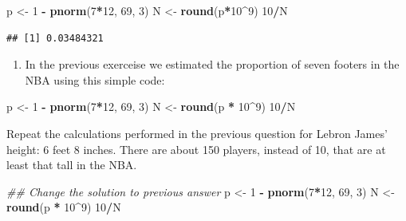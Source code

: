 \documentclass[
]{article}
\newenvironment{Shaded}{\begin{snugshade}}{\end{snugshade}}
\newcommand{\CommentTok}[1]{\textcolor[rgb]{0.56,0.35,0.01}{\textit{#1}}}
\newcommand{\DecValTok}[1]{\textcolor[rgb]{0.00,0.00,0.81}{#1}}
\newcommand{\KeywordTok}[1]{\textcolor[rgb]{0.13,0.29,0.53}{\textbf{#1}}}
\newcommand{\NormalTok}[1]{#1}
\newcommand{\OperatorTok}[1]{\textcolor[rgb]{0.81,0.36,0.00}{\textbf{#1}}}
\newcommand{\StringTok}[1]{\textcolor[rgb]{0.31,0.60,0.02}{#1}}
\providecommand{\tightlist}{%
  \setlength{\itemsep}{0pt}\setlength{\parskip}{0pt}}
\begin{document}
\begin{Shaded}
\begin{Highlighting}[]
\NormalTok{p <-}\StringTok{ }\DecValTok{1} \OperatorTok{-}\StringTok{ }\KeywordTok{pnorm}\NormalTok{(}\DecValTok{7}\OperatorTok{*}\DecValTok{12}\NormalTok{, }\DecValTok{69}\NormalTok{, }\DecValTok{3}\NormalTok{)}
\NormalTok{N <-}\StringTok{ }\KeywordTok{round}\NormalTok{(p}\OperatorTok{*}\DecValTok{10}\OperatorTok{^}\DecValTok{9}\NormalTok{)}
\DecValTok{10}\OperatorTok{/}\NormalTok{N}
\end{Highlighting}
\end{Shaded}

\begin{verbatim}
## [1] 0.03484321
\end{verbatim}

\begin{enumerate}
\def\labelenumi{\arabic{enumi}.}
\setcounter{enumi}{6}
\tightlist
\item
  In the previous exerceise we estimated the proportion of seven footers
  in the NBA using this simple code:
\end{enumerate}

\begin{Shaded}
\begin{Highlighting}[]
\NormalTok{p <-}\StringTok{ }\DecValTok{1} \OperatorTok{-}\StringTok{ }\KeywordTok{pnorm}\NormalTok{(}\DecValTok{7}\OperatorTok{*}\DecValTok{12}\NormalTok{, }\DecValTok{69}\NormalTok{, }\DecValTok{3}\NormalTok{)  }
\NormalTok{N <-}\StringTok{ }\KeywordTok{round}\NormalTok{(p }\OperatorTok{*}\StringTok{ }\DecValTok{10}\OperatorTok{^}\DecValTok{9}\NormalTok{)  }
\DecValTok{10}\OperatorTok{/}\NormalTok{N  }
\end{Highlighting}
\end{Shaded}

Repeat the calculations performed in the previous question for Lebron
James' height: 6 feet 8 inches. There are about 150 players, instead of
10, that are at least that tall in the NBA.

\begin{Shaded}
\begin{Highlighting}[]
\CommentTok{## Change the solution to previous answer}
\NormalTok{p <-}\StringTok{ }\DecValTok{1} \OperatorTok{-}\StringTok{ }\KeywordTok{pnorm}\NormalTok{(}\DecValTok{7}\OperatorTok{*}\DecValTok{12}\NormalTok{, }\DecValTok{69}\NormalTok{, }\DecValTok{3}\NormalTok{)}
\NormalTok{N <-}\StringTok{ }\KeywordTok{round}\NormalTok{(p }\OperatorTok{*}\StringTok{ }\DecValTok{10}\OperatorTok{^}\DecValTok{9}\NormalTok{)}
\DecValTok{10}\OperatorTok{/}\NormalTok{N}
\end{Highlighting}
\end{Shaded}
\end{document}
